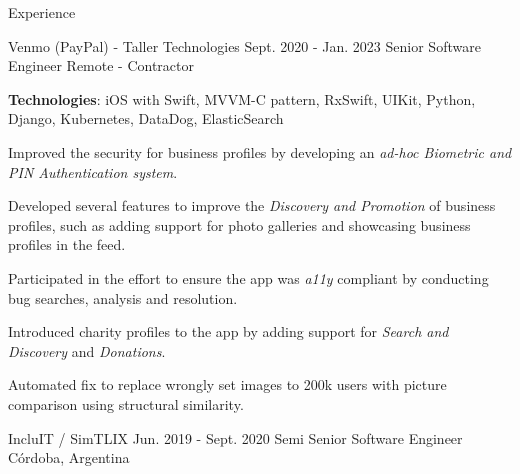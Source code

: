 \documentclass{curriculum}
\begin{document}
\begin{cvsection}{Experience}

    \makesectionitemheader
        {Venmo (PayPal) - Taller Technologies}      {Sept. 2020 - Jan. 2023}
        {Senior Software Engineer}                  {Remote - Contractor}

        \begin{sectionitemlist}
        \item{
            \textbf{Technologies}: iOS with Swift, MVVM-C pattern, RxSwift, UIKit,
            Python, Django, Kubernetes, DataDog, ElasticSearch
        }
        \item{
            Improved the security for business profiles by developing an \textit{ad-hoc Biometric and PIN Authentication system}.
        }
        \item{
            Developed several features to improve the \textit{Discovery and Promotion} of business profiles,
            such as adding support for photo galleries and showcasing business profiles in the feed.
        }
        \item{
            Participated in the effort to ensure the app was \textit{a11y} compliant
            by conducting bug searches, analysis and resolution.
        }
        \item{
            Introduced charity profiles to the app by adding support
            for \textit{Search and Discovery} and \textit{Donations}.
        }
        \item{
            Automated fix to replace wrongly set images to 200k users with
            picture comparison using structural similarity.
        }
        \end{sectionitemlist}


    \makesectionitemheader
        {IncluIT / SimTLIX}                             {Jun. 2019 - Sept. 2020}
        {Semi Senior Software Engineer}                                {Córdoba, Argentina}

        \begin{sectionitemlist}


\end{sectionitemlist}
\end{cvsection}
\end{document}
